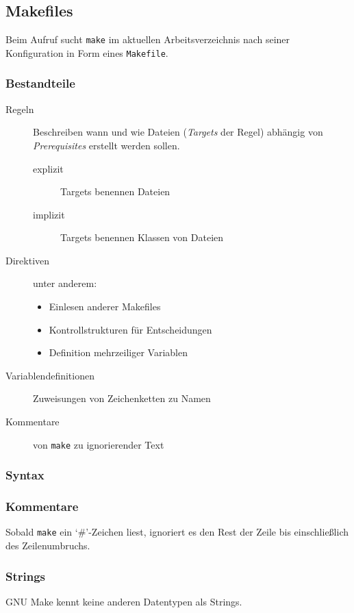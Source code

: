 \subsection{Makefiles}

Beim Aufruf sucht \texttt{make} im aktuellen Arbeitsverzeichnis nach seiner
Konfiguration in Form eines \texttt{Makefile}.

\subsubsection{Bestandteile}

\begin{description}
%
	\item[Regeln] Beschreiben wann und wie Dateien (\emph{Targets} der Regel)
	abhängig von \emph{Prerequisites} erstellt werden sollen.
	\begin{description}
		\item[explizit] Targets benennen Dateien
		\item[implizit] Targets benennen Klassen von Dateien
	\end{description}
%
	\item[Direktiven] unter anderem:
	\begin{itemize}
		\item Einlesen anderer Makefiles
		\item Kontrollstrukturen für Entscheidungen
		\item Definition mehrzeiliger Variablen
	\end{itemize}
%
	\item[Variablendefinitionen] Zuweisungen von Zeichenketten zu Namen
%
	\item[Kommentare] von \texttt{make} zu ignorierender Text
\end{description}

\subsubsection{Syntax}

	\subsubsection*{Kommentare}
		
		Sobald \texttt{make} ein `\#'-Zeichen liest, ignoriert es den Rest der Zeile
		bis einschließlich des Zeilenumbruchs.

	\subsubsection*{Strings}
		
		GNU Make kennt keine anderen Datentypen als Strings.


